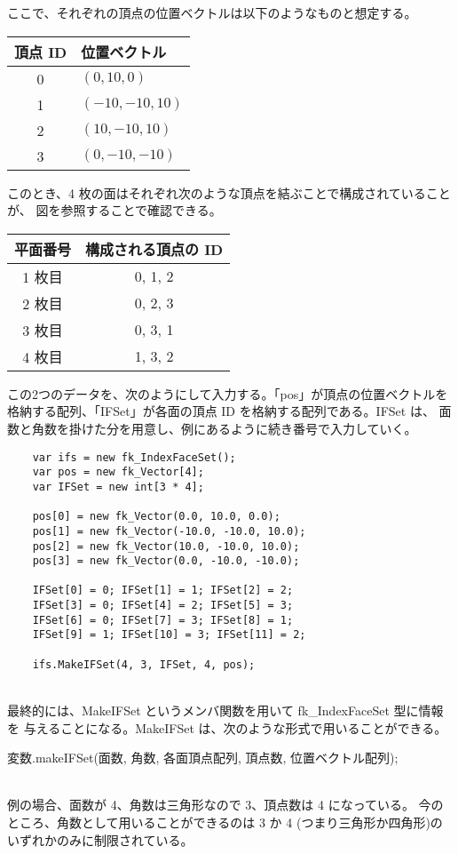 ここで、それぞれの頂点の位置ベクトルは以下のようなものと想定する。
\begin{center}
\begin{tabular}{|c|l|}
\hline
頂点 ID & 位置ベクトル \\ \hline
0 & \((0, 10, 0)\) \\ \hline
1 & \((-10, -10, 10)\) \\ \hline
2 & \((10, -10, 10)\) \\ \hline
3 & \((0, -10, -10)\) \\ \hline
\end{tabular}
\end{center}
このとき、4 枚の面はそれぞれ次のような頂点を結ぶことで構成されていることが、
図を参照することで確認できる。
\begin{center}
\begin{tabular}{|c|c|}
\hline
平面番号 & 構成される頂点の ID \\ \hline
1 枚目 & 0, 1, 2 \\ \hline
2 枚目 & 0, 2, 3 \\ \hline
3 枚目 & 0, 3, 1 \\ \hline
4 枚目 & 1, 3, 2 \\ \hline
\end{tabular}
\end{center}
この2つのデータを、次のようにして入力する。「pos」が頂点の位置ベクトルを
格納する配列、「IFSet」が各面の頂点 ID を格納する配列である。IFSet は、
面数と角数を掛けた分を用意し、例にあるように続き番号で入力していく。
\\
\begin{breakbox}
\begin{verbatim}
    var ifs = new fk_IndexFaceSet();
    var pos = new fk_Vector[4];
    var IFSet = new int[3 * 4];

    pos[0] = new fk_Vector(0.0, 10.0, 0.0);
    pos[1] = new fk_Vector(-10.0, -10.0, 10.0);
    pos[2] = new fk_Vector(10.0, -10.0, 10.0);
    pos[3] = new fk_Vector(0.0, -10.0, -10.0);

    IFSet[0] = 0; IFSet[1] = 1; IFSet[2] = 2;
    IFSet[3] = 0; IFSet[4] = 2; IFSet[5] = 3;
    IFSet[6] = 0; IFSet[7] = 3; IFSet[8] = 1;
    IFSet[9] = 1; IFSet[10] = 3; IFSet[11] = 2;

    ifs.MakeIFSet(4, 3, IFSet, 4, pos);
\end{verbatim}
\end{breakbox}
~ \\
最終的には、MakeIFSet というメンバ関数を用いて fk\_IndexFaceSet 型に情報を
与えることになる。MakeIFSet は、次のような形式で用いることができる。
\\
\begin{screen}
\begin{center}
変数.makeIFSet(面数, 角数, 各面頂点配列, 頂点数, 位置ベクトル配列);
\end{center}
\end{screen}
~ \\
例の場合、面数が 4、角数は三角形なので 3、頂点数は 4 になっている。
今のところ、角数として用いることができるのは 3 か 4
(つまり三角形か四角形)のいずれかのみに制限されている。

